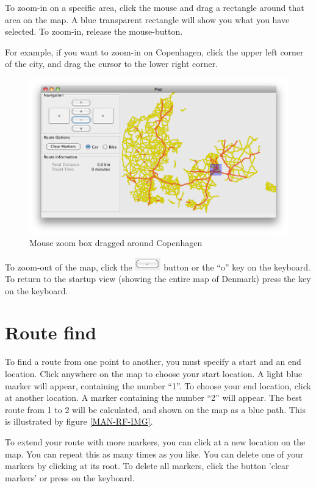 To zoom-in on a specific area, click the mouse and drag a rectangle around that
area on the map. A blue transparent rectangle will show you what you have
selected. To zoom-in, release the mouse-button.

For example, if you want to zoom-in on Copenhagen,
click the upper left corner of the city, and drag the cursor to the lower right
corner.

\begin{figure}[h!]
\centering
\includegraphics[width=1\linewidth]{images/man-copenhagen.png}
\caption{Mouse zoom box dragged around Copenhagen}
\label{MAN-Z-COP}
\end{figure}

To zoom-out of the map, click the
\includegraphics[height=1.5em]{images/zoomoutbutton.png} button or the ``o''
key on the keyboard. To return to the startup view (showing the entire map of
Denmark) press the  key on the keyboard.

\section{Route find}
\label{MAN-RF}
To find a route from one point to another, you must specify a start and an end
location. Click anywhere on the map to choose your start location. A light blue
marker will appear, containing the number ``1''. To choose your end location,
click at another location. A marker containing the number ``2'' will appear. The
best route from 1 to 2 will be calculated, and shown on the map as a blue path.
This is illustrated by figure \ref{MAN-RF-IMG}.

To extend your route with more markers, you can click at a new location on the 
map. You can repeat this as many times as you like. You can delete one of
your markers by clicking at its root. To delete all markers, click the button
'clear markers' or press  on the keyboard.

